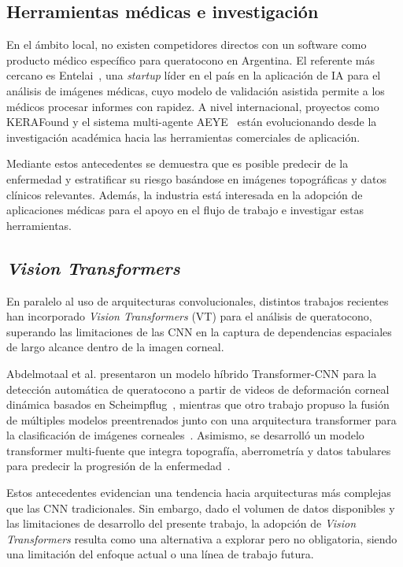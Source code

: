     \par\vspace{-0.1 cm}
    \subsection*{Herramientas médicas e investigación}
    
        En el ámbito local, no existen competidores directos con un software como producto médico específico para queratocono en Argentina. El referente más cercano es Entelai~, una \textit{startup} líder en el país en la aplicación de IA para el análisis de imágenes médicas, cuyo modelo de validación asistida permite a los médicos procesar informes con rapidez. A nivel internacional, proyectos como KERAFound y el sistema multi-agente AEYE~ están evolucionando desde la investigación académica hacia las herramientas comerciales de aplicación.
    
        Mediante estos antecedentes se demuestra que es posible predecir de la enfermedad y estratificar su riesgo basándose en imágenes topográficas y datos clínicos relevantes. Además, la industria está interesada en la adopción de aplicaciones médicas para el apoyo en el flujo de trabajo e investigar estas herramientas.

    \subsection*{\textit{Vision Transformers}}

        En paralelo al uso de arquitecturas convolucionales, distintos trabajos recientes han incorporado \textit{Vision Transformers} (VT) para el análisis de queratocono, superando las limitaciones de las CNN en la captura de dependencias espaciales de largo alcance dentro de la imagen corneal. 

        Abdelmotaal et al. presentaron un modelo híbrido Transformer-CNN para la detección automática de queratocono a partir de videos de deformación corneal dinámica basados en Scheimpflug~, mientras que otro trabajo propuso la fusión de múltiples modelos preentrenados junto con una arquitectura transformer para la clasificación de imágenes corneales~. Asimismo, se desarrolló un modelo transformer multi-fuente que integra topografía, aberrometría y datos tabulares para predecir la progresión de la enfermedad~. 
        
        Estos antecedentes evidencian una tendencia hacia arquitecturas más complejas que las CNN tradicionales. Sin embargo, dado el volumen de datos disponibles y las limitaciones de desarrollo del presente trabajo, la adopción de \textit{Vision Transformers} resulta como una alternativa a explorar pero no obligatoria, siendo una limitación del enfoque actual o una línea de trabajo futura.

